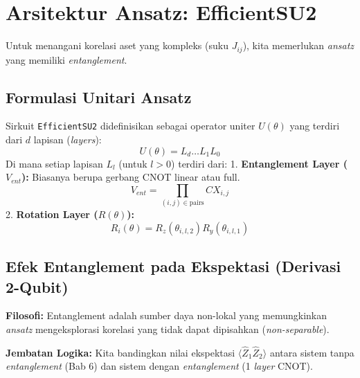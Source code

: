 \hypertarget{arsitektur-ansatz-efficientsu2}{%
\section{Arsitektur Ansatz: EfficientSU2}\label{arsitektur-ansatz-efficientsu2}}

Untuk menangani korelasi aset yang kompleks (suku \(J_{ij}\)), kita memerlukan \emph{ansatz} yang memiliki \emph{entanglement}.

\hypertarget{a.-formulasi-unitari-ansatz}{%
\subsection{Formulasi Unitari Ansatz}\label{a.-formulasi-unitari-ansatz}}

Sirkuit \texttt{EfficientSU2} didefinisikan sebagai operator uniter \(U(\theta)\) yang terdiri dari \(d\) lapisan (\emph{layers}): \[ U(\theta) = L_d \dots L_1 L_0 \] Di mana setiap lapisan \(L_l\) (untuk \(l > 0\)) terdiri dari: 1. \textbf{Entanglement Layer (\(V_{ent}\)):} Biasanya berupa gerbang CNOT linear atau full. \[ V_{ent} = \prod_{(i,j) \in \text{pairs}} CX_{i,j} \] 2. \textbf{Rotation Layer (\(R(\theta)\)):} \[ R_i(\theta) = R_z(\theta_{i,l,2}) R_y(\theta_{i,l,1}) \]

\hypertarget{b.-efek-entanglement-pada-ekspektasi-derivasi-2-qubit}{%
\subsection{Efek Entanglement pada Ekspektasi (Derivasi 2-Qubit)}\label{b.-efek-entanglement-pada-ekspektasi-derivasi-2-qubit}}

\textbf{Filosofi:} Entanglement adalah sumber daya non-lokal yang memungkinkan \emph{ansatz} mengeksplorasi korelasi yang tidak dapat dipisahkan (\emph{non-separable}).

\textbf{Jembatan Logika:} Kita bandingkan nilai ekspektasi \(\langle \hat{Z}_1 \hat{Z}_2 \rangle\) antara sistem tanpa \emph{entanglement} (Bab 6) dan sistem dengan \emph{entanglement} (1 \emph{layer} CNOT).

